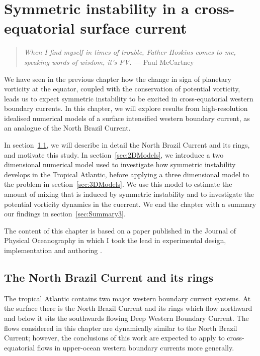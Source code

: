 \chapter{Symmetric instability in a cross-equatorial surface current}
\label{chap:3}
\begin{quote}
    \textit{When I find myself in times of trouble, Father Hoskins comes to me, speaking words of wisdom, it's PV.} --- Paul McCartney
\end{quote}

We have seen in the previous chapter how the change in sign of planetary vorticity at the equator, coupled with the conservation of potential vorticity, leads us to expect symmetric instability to be excited in cross-equatorial western boundary currents. In this chapter, we will explore results from high-resolution idealised numerical models of a surface intensified western boundary current, as an analogue of the North Brazil Current.

In section~\ref{sec:NBCandR}, we will describe in detail the North Brazil Current and its rings, and motivate this study. In section~\ref{sec:2DModels}, we introduce a two dimensional numerical model used to investigate how symmetric instability develops in the Tropical Atlantic, before applying a three dimensional model to the problem in section~\ref{sec:3DModels}. We use this model to estimate the amount of mixing that is induced by symmetric instability and to investigate the potential vorticity dynamics in the cuerrent. We end the chapter with a summary our findings in section~\ref{sec:Summary3}.

The content of this chapter is based on a paper published in the Journal of Physical Oceanography in which I took the lead in experimental design, implementation and authoring \citep{Goldsworth2021}.

\section{The North Brazil Current and its rings}
\label{sec:NBCandR}
The tropical Atlantic contains two major western boundary current systems. At the surface there is the North Brazil Current and its rings which flow northward and below it sits the southwards flowing Deep Western Boundary Current. The flows considered in this chapter are dynamically similar to the North Brazil Current; however, the conclusions of this work are expected to apply to cross-equatorial flows in upper-ocean western boundary currents more generally.


